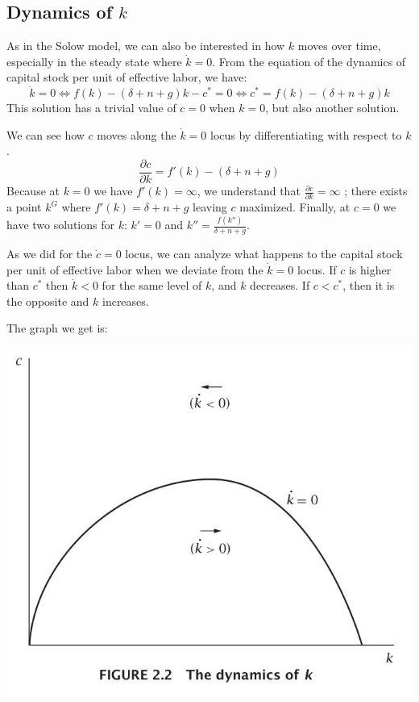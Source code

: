 \documentclass[12pt]{report}
\begin{document}
\subsection{Dynamics of $k$}

As in the Solow model, we can also be interested in how $k$ moves over time, especially in the steady state where $\dot k = 0$. From the equation of the dynamics of capital stock per unit of effective labor, we have: $$\dot k = 0 \Leftrightarrow f(k) -(\delta + n + g)k - c^* = 0 \Leftrightarrow c^* = f(k) -(\delta + n + g)k $$ This solution has a trivial value of $c=0$ when $k=0$, but also another solution.

We can see how $c$ moves along the $\dot k = 0$ locus by differentiating with respect to $k$. $$ \frac{\partial c}{\partial k} = f'(k) - (\delta + n + g) $$ Because at $k = 0$ we have $f'(k) = \infty $, we understand that $\frac{\partial c}{\partial k} = \infty$ ; there exists a point $k^G$ where $ f'(k) = \delta + n + g $ leaving $c$ maximized. Finally, at $c=0$ we have two solutions for $k$: $k' = 0$ and $k'' = \frac{f(k'')}{\delta + n + g}$.

As we did for the $\dot c = 0$ locus, we can analyze what happens to the capital stock per unit of effective labor when we deviate from the $\dot k = 0 $ locus. If $c$ is higher than $c^*$ then $\dot k < 0$ for the same level of $k$, and $k$ decreases. If $c < c^*$, then it is the opposite and $k$ increases.

The graph we get is:
\begin{center}
\includegraphics[scale=0.75]{images/kdynamics}
\end{center}
\end{document}
